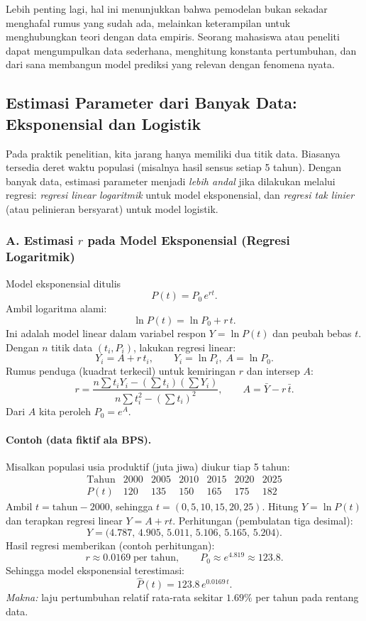 \documentclass{bukumjh}
\begin{document}
Lebih penting lagi, hal ini menunjukkan bahwa pemodelan bukan sekadar menghafal rumus yang sudah ada, melainkan keterampilan untuk {\jsg menghubungkan teori dengan data empiris}. Seorang mahasiswa atau peneliti dapat mengumpulkan data sederhana, menghitung konstanta pertumbuhan, dan dari sana membangun model prediksi yang relevan dengan fenomena nyata.

\subsection*{Estimasi Parameter dari Banyak Data: Eksponensial dan Logistik}

Pada praktik penelitian, kita jarang hanya memiliki dua titik data. Biasanya tersedia deret waktu populasi (misalnya hasil sensus setiap 5 tahun). Dengan banyak data, estimasi parameter menjadi \emph{lebih andal} jika dilakukan melalui regresi: \emph{regresi linear logaritmik} untuk model eksponensial, dan \emph{regresi tak linier} (atau pelinieran bersyarat) untuk model logistik.

\subsubsection*{A. Estimasi $r$ pada Model Eksponensial (Regresi Logaritmik)}
Model eksponensial ditulis
\[
P(t)=P_0\,e^{rt}.
\]
Ambil logaritma alami:
\[
\ln P(t)=\ln P_0 + r\,t.
\]
Ini adalah model {\jsg linear} dalam variabel respon $Y=\ln P(t)$ dan peubah bebas $t$.
Dengan $n$ titik data $(t_i,P_i)$, lakukan {\jsg regresi linear}:
\[
Y_i = A + r\,t_i, \qquad Y_i=\ln P_i,\; A=\ln P_0.
\]
Rumus penduga (kuadrat terkecil) untuk kemiringan $r$ dan intersep $A$:
\[
r=\frac{n\sum t_iY_i-\left(\sum t_i\right)\left(\sum Y_i\right)}
{n\sum t_i^2-\left(\sum t_i\right)^2},\qquad
A=\bar Y - r\,\bar t.
\]
Dari $A$ kita peroleh $P_0=e^A$.

\paragraph{Contoh (data fiktif ala BPS).}
Misalkan populasi usia produktif (juta jiwa) diukur tiap 5 tahun:
\[
\begin{array}{c|cccccc}
\text{Tahun} & 2000 & 2005 & 2010 & 2015 & 2020 & 2025\\\hline
P(t) & 120 & 135 & 150 & 165 & 175 & 182
\end{array}
\]
Ambil $t=\text{tahun}-2000$, sehingga $t=(0,5,10,15,20,25)$.
Hitung $Y=\ln P(t)$ dan terapkan regresi linear $Y=A+rt$.
Perhitungan (pembulatan tiga desimal):
\[
Y=\bigl(4.787,\,4.905,\,5.011,\,5.106,\,5.165,\,5.204\bigr).
\]
Hasil regresi memberikan (contoh perhitungan):
\[
r \approx 0.0169\;\text{per tahun},\qquad P_0\approx e^{4.819}\approx 123.8.
\]
Sehingga model eksponensial terestimasi:
\[
\widehat{P}(t)=123.8\,e^{0.0169\,t}.
\]
\textit{Makna:} laju pertumbuhan relatif rata-rata sekitar $1.69\%$ per tahun pada rentang data.
\end{document}
